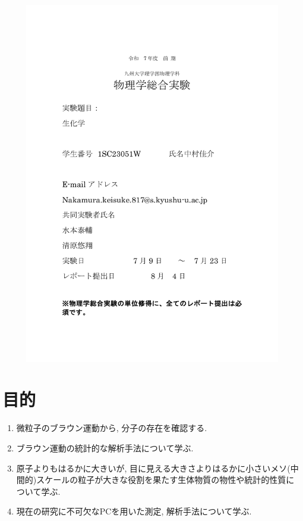 \documentclass[11pt]{ltjsarticle}
\begin{document}
\begin{figure}[H]
  \centering
  \includegraphics[width=\textwidth]{hyoushi.pdf}
\end{figure}
  \section*{目的}
    \begin{enumerate}
      \item 微粒子のブラウン運動から, 分子の存在を確認する.
      \item ブラウン運動の統計的な解析手法について学ぶ.
      \item 原子よりもはるかに大きいが, 目に見える大きさよりはるかに小さいメソ(中間的)スケールの粒子が大きな役割を果たす生体物質の物性や統計的性質について学ぶ.
      \item 現在の研究に不可欠なPCを用いた測定, 解析手法について学ぶ.
    \end{enumerate}
\end{document}
